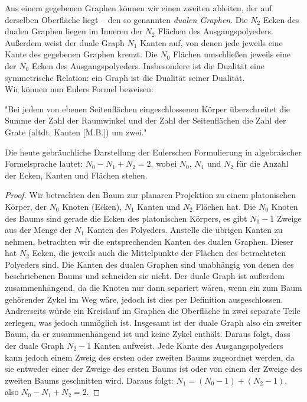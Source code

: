 Aus einem gegebenen Graphen können wir einen zweiten ableiten, der auf derselben Oberfläche liegt -- den so genannten \textit{dualen Graphen}. 
Die $N_2$ Ecken des dualen Graphen liegen im Inneren der $N_2$ Flächen des Ausgangspolyeders. Außerdem weist der duale Graph $N_1$ Kanten auf, von denen jede jeweils eine Kante des gegebenen Graphen kreuzt. Die $N_0$ Flächen umschließen jeweils eine der $N_0$ Ecken des Ausgangspolyeders. Insbesondere ist die Dualität eine symmetrische Relation: ein Graph ist die Dualität seiner Dualität.\\ 
Wir können nun Eulers Formel beweisen: 
\begin{theorem} 
"Bei jedem von ebenen Seitenflächen eingeschlossenen Körper überschreitet die Summe der Zahl der Raumwinkel und der Zahl der Seitenflächen die Zahl der Grate (altdt. Kanten [M.B.]) um zwei."
\end{theorem}
Die heute gebräuchliche Darstellung der Eulerschen Formulierung in algebraischer Formelsprache lautet:
$N_0 - N_1 + N_2 =2 $, wobei $N_0$, $N_1$ und $N_2$ für die Anzahl der Ecken, Kanten und Flächen stehen.
\begin{proof}
Wir betrachten den Baum zur planaren Projektion zu einem platonischen Körper, der $N_0$ Knoten (Ecken), $N_1$ Kanten und $N_2$ Flächen hat. Die $N_0$ Knoten des Baums sind gerade die Ecken des platonischen Körpers, es gibt $N_0 -1$ Zweige aus der Menge der $N_1$ Kanten des Polyeders. Anstelle die übrigen Kanten zu nehmen, betrachten wir die entsprechenden Kanten des dualen Graphen. Dieser hat $N_2$ Ecken, die jeweils auch die Mittelpunkte der Flächen des betrachteten Polyeders sind. Die Kanten des dualen Graphen sind unabhängig von denen des beschriebenen Baums und schneiden sie nicht. Der duale Graph ist außerdem zusammenhängend, da die Knoten nur dann separiert wären, wenn ein zum Baum gehörender Zykel im Weg wäre, jedoch ist dies per Definition ausgeschlossen. Andrerseits würde ein Kreislauf im Graphen die Oberfläche in zwei separate Teile zerlegen, was jedoch unmöglich ist. Insgesamt ist der duale Graph also ein zweiter Baum, da er zusammenhängend ist und keine Zykel enthält. Daraus folgt, dass der duale Graph $N_2-1$ Kanten aufweist. Jede Kante des Ausgangspolyeders kann jedoch einem Zweig des ersten oder zweiten Baums zugeordnet werden, da sie entweder einer der Zweige des ersten Baums ist oder von einem der Zweige des zweiten Baums geschnitten wird. Daraus folgt: $N_1 = (N_0-1) + (N_2-1)$, also $N_0 - N_1 + N_2 =2 $. 
\end{proof}
